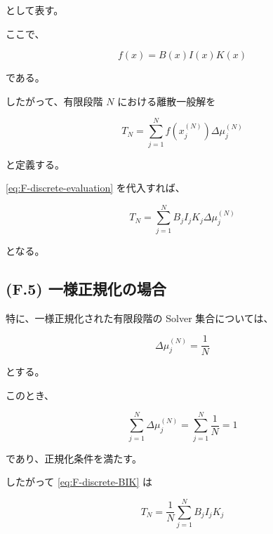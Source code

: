 \documentclass[a4paper,11pt]{article}
\begin{document}
として表す。

ここで、

\begin{equation}
    f(x)=B(x)I(x)K(x)
\end{equation}

である。

したがって、有限段階 $N$ における離散一般解を

\begin{equation}
    \boxed{
        T_N
        =
        \sum_{j=1}^{N}
        f\!\left(x_j^{(N)}\right)
        \Delta\mu_j^{(N)}
    }
    \label{eq:F-discrete-general}
\end{equation}

と定義する。

\eqref{eq:F-discrete-evaluation} を代入すれば、

\begin{equation}
    T_N
    =
    \sum_{j=1}^{N}
    B_j I_j K_j
    \Delta\mu_j^{(N)}
    \label{eq:F-discrete-BIK}
\end{equation}

となる。


\subsection{(F.5) 一様正規化の場合}
\label{subsec:F5}

特に、一様正規化された有限段階の Solver 集合については、

\begin{equation}
    \boxed{
        \Delta\mu_j^{(N)}
        =
        \frac{1}{N}
    }
    \label{eq:F-uniform-measure}
\end{equation}

とする。

このとき、

\begin{equation}
    \sum_{j=1}^{N}
    \Delta\mu_j^{(N)}
    =
    \sum_{j=1}^{N}
    \frac1N
    =
    1
\end{equation}

であり、正規化条件を満たす。

したがって \eqref{eq:F-discrete-BIK} は

\begin{equation}
    \boxed{
        T_N
        =
        \frac1N
        \sum_{j=1}^{N}
        B_jI_jK_j
    }
    \label{eq:F-ECA-discrete}
\end{equation}
\end{document}
